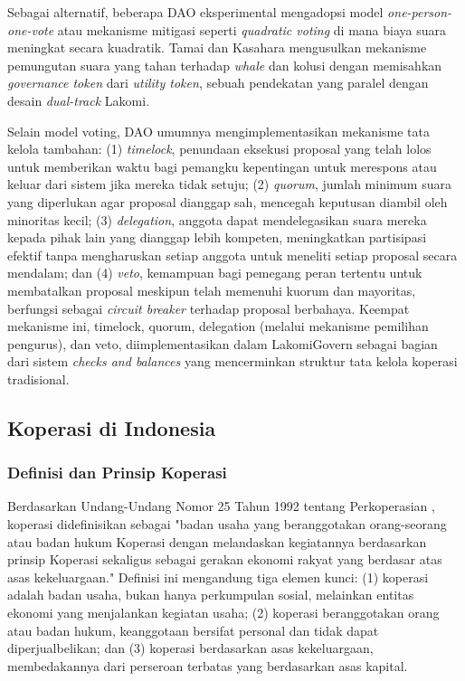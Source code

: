 Sebagai alternatif, beberapa DAO eksperimental mengadopsi model \textit{one-person-one-vote} atau mekanisme mitigasi seperti \textit{quadratic voting} di mana biaya suara meningkat secara kuadratik. Tamai dan Kasahara \cite{tamai2024dao} mengusulkan mekanisme pemungutan suara yang tahan terhadap \textit{whale} dan kolusi dengan memisahkan \textit{governance token} dari \textit{utility token}, sebuah pendekatan yang paralel dengan desain \textit{dual-track} Lakomi.

Selain model voting, DAO umumnya mengimplementasikan mekanisme tata kelola tambahan: (1) \textit{timelock}, penundaan eksekusi proposal yang telah lolos untuk memberikan waktu bagi pemangku kepentingan untuk merespons atau keluar dari sistem jika mereka tidak setuju; (2) \textit{quorum}, jumlah minimum suara yang diperlukan agar proposal dianggap sah, mencegah keputusan diambil oleh minoritas kecil; (3) \textit{delegation}, anggota dapat mendelegasikan suara mereka kepada pihak lain yang dianggap lebih kompeten, meningkatkan partisipasi efektif tanpa mengharuskan setiap anggota untuk meneliti setiap proposal secara mendalam; dan (4) \textit{veto}, kemampuan bagi pemegang peran tertentu untuk membatalkan proposal meskipun telah memenuhi kuorum dan mayoritas, berfungsi sebagai \textit{circuit breaker} terhadap proposal berbahaya. Keempat mekanisme ini, timelock, quorum, delegation (melalui mekanisme pemilihan pengurus), dan veto, diimplementasikan dalam LakomiGovern sebagai bagian dari sistem \textit{checks and balances} yang mencerminkan struktur tata kelola koperasi tradisional.

\subsection{Koperasi di Indonesia}

\subsubsection{Definisi dan Prinsip Koperasi}

Berdasarkan Undang-Undang Nomor 25 Tahun 1992 tentang Perkoperasian \cite{uu251992}, koperasi didefinisikan sebagai "badan usaha yang beranggotakan orang-seorang atau badan hukum Koperasi dengan melandaskan kegiatannya berdasarkan prinsip Koperasi sekaligus sebagai gerakan ekonomi rakyat yang berdasar atas asas kekeluargaan." Definisi ini mengandung tiga elemen kunci: (1) koperasi adalah badan usaha, bukan hanya perkumpulan sosial, melainkan entitas ekonomi yang menjalankan kegiatan usaha; (2) koperasi beranggotakan orang atau badan hukum, keanggotaan bersifat personal dan tidak dapat diperjualbelikan; dan (3) koperasi berdasarkan asas kekeluargaan, membedakannya dari perseroan terbatas yang berdasarkan asas kapital.

